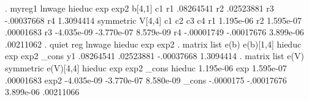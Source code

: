 . myreg1 lnwage hieduc exp exp2 
{\smallskip}
b[4,1]
            c1
r1   .08264541
r2   .02523881
r3  -.00037668
r4   1.3094414
{\smallskip}
symmetric V[4,4]
            c1          c2          c3          c4
r1   1.195e-06
r2   1.595e-07   .00001683
r3  -4.035e-09  -3.770e-07   8.579e-09
r4  -.00001749  -.00017676   3.899e-06   .00211062
{\smallskip}
. quiet reg lnwage hieduc exp exp2
{\smallskip}
. matrix list e(b)
{\smallskip}
e(b)[1,4]
        hieduc         exp        exp2       _cons
y1   .08264541   .02523881  -.00037668   1.3094414
{\smallskip}
. matrix list e(V)
{\smallskip}
symmetric e(V)[4,4]
            hieduc         exp        exp2       _cons
hieduc   1.195e-06
   exp   1.595e-07   .00001683
  exp2  -4.035e-09  -3.770e-07   8.580e-09
 _cons   -.0000175  -.00017676   3.899e-06   .00211066
{\smallskip}
